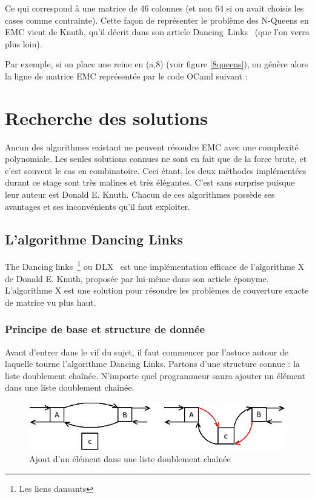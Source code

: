 \documentclass[a4paper]{article}
\begin{document}
Ce qui correspond à une matrice de 46 colonnes (et non 64 si on avait choisis
les cases comme contrainte).
Cette façon de représenter le problème des N-Queens en EMC vient de Knuth, qu'il
décrit dans son article Dancing~Links~\cite{dlx} (que l'on verra plus loin).

Par exemple, si on place une reine en (a,8) (voir figure \ref{8queens}), on 
génère alors la ligne de matrice EMC représentée par le code OCaml suivant : 




\section{Recherche des solutions}

Aucun des algorithmes existant ne peuvent résoudre EMC
avec une complexité polynomiale. Les seules solutions connues ne sont en fait
que de la force brute, et c'est souvent le cas en combinatoire.
Ceci étant, les deux méthodes implémentées durant ce stage sont 
très malines et très élégantes. C'est sans surprise puisque leur auteur est 
Donald E. Knuth.
Chacun de ces algorithmes possède ses avantages et ses inconvénients qu'il faut 
exploiter.

\subsection{L'algorithme Dancing Links}

The Dancing links~\footnote{Les liens dansants} ou DLX~\cite{dlx} 
est une implémentation efficace de l'algorithme X de Donald 
E. Knuth, proposée par lui-même dans son article éponyme. 
L'algorithme X est une solution pour résoudre 
les problèmes de couverture exacte de matrice vu plus haut.



\subsubsection{Principe de base et structure de donnée}

Avant d'entrer dans le vif du sujet, il faut commencer par l'astuce autour de 
laquelle tourne l'algorithme Dancing Links.
Partons d'une structure connue : la liste doublement chaînée.
N'importe quel programmeur saura ajouter un élément dans une liste doublement
chaînée.


\begin{figure}[h]
\begin{center}
\includegraphics[scale=0.5]{../imports/add_elmt_dll.png}
\caption{\label{add_dll} Ajout d'un élément dans une liste doublement chaînée}
\end{center}
\end{figure}
\end{document}
